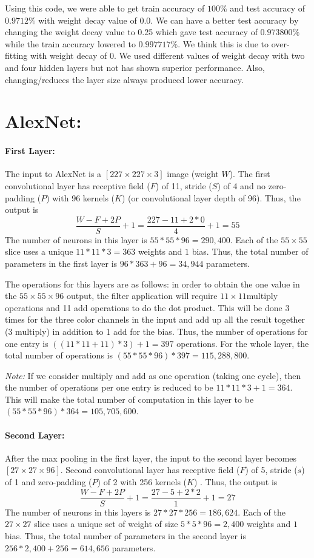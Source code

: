 \documentclass[12pt] {article}
\begin{document}
Using this code, we were able to get train accuracy of $100\%$ and test accuracy of $0.9712\%$ with weight decay value of 0.0. We can have a better test accuracy by changing the weight decay value to 0.25 which gave test accuracy of $0.973800\%$ while the train accuracy lowered to $0.997717\%$. We think this is due to over-fitting with weight decay of 0. We used different values of weight decay with two and four hidden layers but not has shown superior performance. Also, changing/reduces the layer size always produced lower accuracy. 

\newpage
\section*{AlexNet:}
\paragraph{First Layer:} The input to AlexNet is a $[227 \times 227 \times 3]$ image (weight $W$). The first convolutional layer has receptive field ($F$) of 11, stride ($S$) of 4 and no zero-padding ($P$) with 96 kernels ($K$) (or  convolutional layer depth of 96). Thus, the output is 	
$$
\frac{W-F+2P}{S} + 1 = \frac{227 - 11 + 2*0}{4} + 1 = 55
$$
The number of neurons in this layer is $55*55*96=290,400$. Each of the $55\times 55$ slice uses a unique $11*11*3=363$ weights and $1$ bias. Thus, the total number of parameters in the first layer is $96*363 + 96 = 34,944$ parameters. 

The operations for this layers are as follows: in order to obtain the one value in the $55 \times 55 \times 96$ output, the filter application will require $11\times 11$multiply operations and 11 add operations to do the dot product. This will be done 3 times for the three color channels in the input and add up all the result together (3 multiply) in addition to 1 add for the bias. Thus, the number of operations for one entry is $((11*11 + 11)*3)+1=397$ operations. For the whole layer, the total number of operations is $(55*55*96)*397= 115,288,800$. 

\emph{Note:} If we consider multiply and add as one operation (taking one cycle), then the number of operations per one entry is reduced to be $11*11*3+1=364$. This will make the total number of computation in this layer to be $(55*55*96)*364=105,705,600$.

\paragraph{Second Layer:} After the max pooling in the first layer, the input to the second layer becomes $[27 \times 27 \times 96]$. Second convolutional layer has receptive field ($F$) of 5, stride ($s$) of 1 and zero-padding ($P$) of 2 with 256 kernels ($K$) . Thus, the output is 
$$
\frac{W-F+2P}{S} + 1 = \frac{27-5+2*2}{1} + 1 = 27
$$
The number of neurons in this layers is $27*27*256=186,624$. Each of the $27 \times 27$ slice uses a unique set of weight of size $5*5*96=2,400$ weights and $1$ bias. Thus, the total number of parameters in the second layer is $256*2,400 + 256= 614,656$ parameters.
\end{document}
